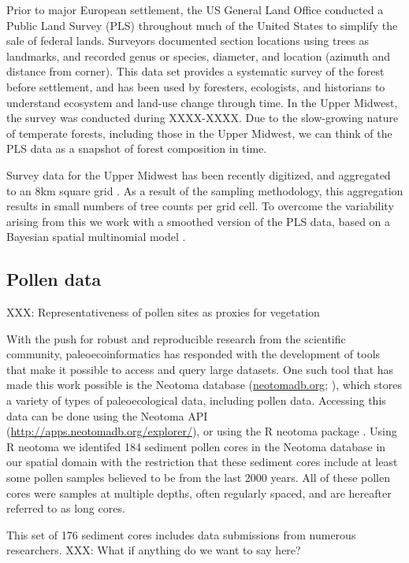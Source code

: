 \documentclass[12pt]{article}
\begin{document}
Prior to major European settlement, the US General Land Office
conducted a Public Land Survey (PLS) throughout much of the United
States to simplify the sale of federal lands. Surveyors
documented section locations using trees as landmarks, and recorded
genus or species, diameter, and location (azimuth and distance from
corner). This data set provides a systematic survey of the forest
before settlement, and has been used by foresters, ecologists, and
historians to understand ecosystem and land-use change through
time. In the Upper Midwest, the survey was conducted during
XXXX-XXXX. Due to the slow-growing nature of temperate forests,
including those in the Upper Midwest, we can think of the PLS data as
a snapshot of forest composition in time. 

Survey data for the Upper Midwest has been recently digitized, and
aggregated to an 8km square grid \citep{XXX}. As a result of the
sampling methodology, this aggregation results in small numbers of
tree counts per grid cell. To overcome the variability arising from
this we work with a smoothed version of the PLS data, based on a
Bayesian spatial multinomial model \citep{paciorek_composition}. 

\subsection{Pollen data}
XXX: Representativeness of pollen sites as proxies for vegetation

With the push for robust and reproducible research from the scientific
community, paleoecoinformatics has responded with the development of
tools that make it possible to access and query large datasets. One
such tool that has made this work possible is the Neotoma database
(\url{neotomadb.org}; \citep{XXX}), which stores a variety of types of
paleoecological data, including pollen data. Accessing this data can
be done using the Neotoma API
(\url{http://apps.neotomadb.org/explorer/}), or using the R neotoma
package \citep{goring2015}. Using R neotoma we identifed 184 sediment
pollen cores in the Neotoma database in our spatial domain with the
restriction that these sediment cores include at least some pollen
samples believed to be from the last 2000 years. All of these pollen
cores were samples at multiple depths, often regularly spaced, and are
hereafter referred to as long cores.

This set of 176 sediment cores includes data submissions from numerous
researchers. XXX: What if anything do we want to say here?
\end{document}
